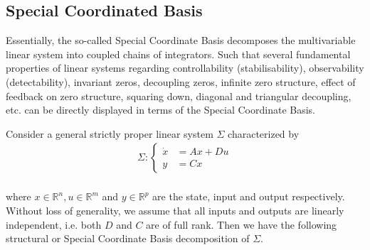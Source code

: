 \documentclass[11pt,letterpaper,twoside,openright]{report}
\newcommand{\RE}{\mathbb{R}}
\begin{document}
\subsection{Special Coordinated Basis} 
Essentially, the so-called Special Coordinate Basis \cite{Chen2004}\cite{Sannuti1986} decomposes the multivariable linear system into coupled chains of integrators. Such that several fundamental properties of linear systems regarding controllability (stabilisability), observability (detectability), invariant zeros, decoupling zeros, infinite zero structure, effect of feedback on zero structure, squaring down, diagonal and triangular decoupling, etc. can be directly displayed in terms of the Special Coordinate Basis.

Consider a general strictly proper linear system $\Sigma$ characterized by
\begin{equation}
	\begin{split}\label{ecu: Sigma}
		\Sigma: \left\{
		\begin{array}{rl}
			\dot{x} & =Ax+Du \\
			y & = Cx
		\end{array}
		\right. \\
	\end{split}
\end{equation}

where $x\in \RE^n, u\in \RE^m$ and $y\in \RE^p$ are the state, input and output respectively. Without loss of generality, we assume that all inputs and outputs are linearly independent, i.e. both $D$ and $C$ are of full rank. Then we have the following structural or Special Coordinate Basis decomposition of $\Sigma$.
\end{document}
